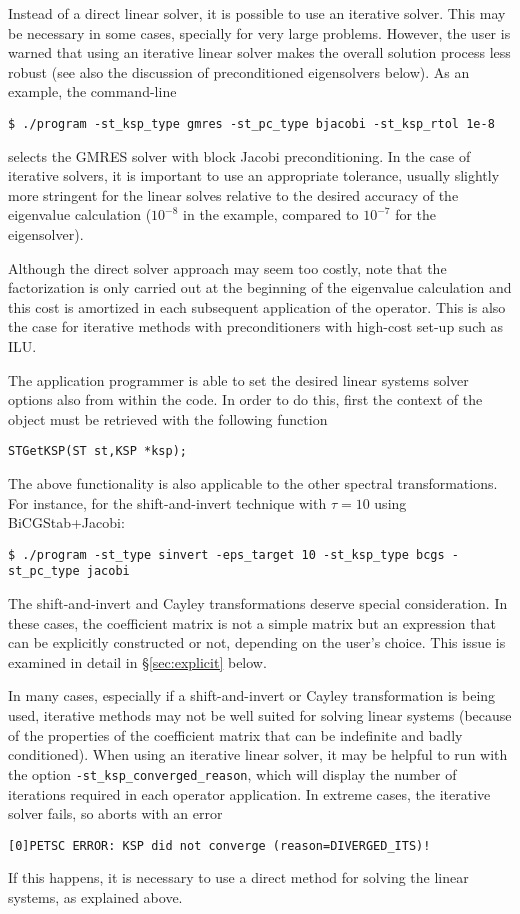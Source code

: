 	Instead of a direct linear solver, it is possible to use an iterative solver. This may be necessary in some cases, specially for very large problems. However, the user is warned that using an iterative linear solver makes the overall solution process less robust (see also the discussion of preconditioned eigensolvers below). As an example, the command-line
\begin{Verbatim}[fontsize=\small]
	$ ./program -st_ksp_type gmres -st_pc_type bjacobi -st_ksp_rtol 1e-8
\end{Verbatim}
selects the GMRES solver with block Jacobi preconditioning. In the case of iterative solvers, it is important to use an appropriate tolerance, usually slightly more stringent for the linear solves relative to the desired accuracy of the eigenvalue calculation ($10^{-8}$ in the example, compared to $10^{-7}$ for the eigensolver). 

	Although the direct solver approach may seem too costly, note that the factorization is only carried out at the beginning of the eigenvalue calculation and this cost is amortized in each subsequent application of the operator. This is also the case for iterative methods with preconditioners with high-cost set-up such as ILU.

	The application programmer is able to set the desired linear systems solver options also from within the code. In order to do this, first the context of the  object must be retrieved with the following function
	\begin{Verbatim}[fontsize=\small]
	STGetKSP(ST st,KSP *ksp);
	\end{Verbatim}
	
	The above functionality is also applicable to the other spectral transformations. For instance, for the shift-and-invert technique with $\tau=10$ using BiCGStab+Jacobi:
\begin{Verbatim}[fontsize=\small]
	$ ./program -st_type sinvert -eps_target 10 -st_ksp_type bcgs -st_pc_type jacobi
\end{Verbatim}
	The shift-and-invert and Cayley transformations deserve special consideration. In these cases, the coefficient matrix is not a simple matrix but an expression that can be explicitly constructed or not, depending on the user's choice. This issue is examined in detail in \S\ref{sec:explicit} below.

In many cases, especially if a shift-and-invert or Cayley transformation is being used, iterative methods may not be well suited for solving linear systems (because of the properties of the coefficient matrix that can be indefinite and badly conditioned). When using an iterative linear solver, it may be helpful to run with the option \Verb!-st_ksp_converged_reason!, which will display the number of iterations required in each operator application.
In extreme cases, the iterative solver fails, so  aborts with an error
\begin{Verbatim}[fontsize=\small]
	[0]PETSC ERROR: KSP did not converge (reason=DIVERGED_ITS)!
\end{Verbatim}
If this happens, it is necessary to use a direct method for solving the linear systems, as explained above.

